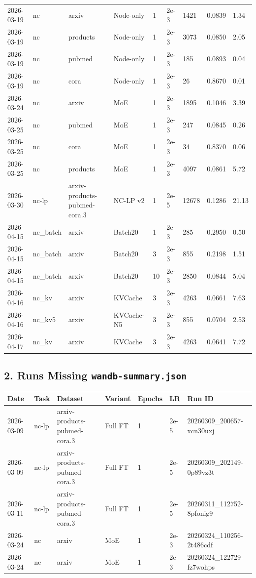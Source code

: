 \begin{longtable}{lllllllll}
2026-03-19 & nc & arxiv & Node-only & 1 & 2e-3 & 1421 & 0.0839 & 1.34 \\
2026-03-19 & nc & products & Node-only & 1 & 2e-3 & 3073 & 0.0850 & 2.05 \\
2026-03-19 & nc & pubmed & Node-only & 1 & 2e-3 & 185 & 0.0893 & 0.04 \\
2026-03-19 & nc & cora & Node-only & 1 & 2e-3 & 26 & 0.8670 & 0.01 \\
2026-03-24 & nc & arxiv & MoE & 1 & 2e-3 & 1895 & 0.1046 & 3.39 \\
2026-03-25 & nc & pubmed & MoE & 1 & 2e-3 & 247 & 0.0845 & 0.26 \\
2026-03-25 & nc & cora & MoE & 1 & 2e-3 & 34 & 0.8370 & 0.06 \\
2026-03-25 & nc & products & MoE & 1 & 2e-3 & 4097 & 0.0861 & 5.72 \\
2026-03-30 & nc-lp & arxiv-products-pubmed-cora.3 & NC-LP v2 & 1 & 2e-5 & 12678 & 0.1286 & 21.13 \\
2026-04-15 & nc\_batch & arxiv & Batch20 & 1 & 2e-3 & 285 & 0.2950 & 0.50 \\
2026-04-15 & nc\_batch & arxiv & Batch20 & 3 & 2e-3 & 855 & 0.2198 & 1.51 \\
2026-04-15 & nc\_batch & arxiv & Batch20 & 10 & 2e-3 & 2850 & 0.0844 & 5.04 \\
2026-04-16 & nc\_kv & arxiv & KVCache & 3 & 2e-3 & 4263 & 0.0661 & 7.63 \\
2026-04-16 & nc\_kv5 & arxiv & KVCache-N5 & 3 & 2e-3 & 855 & 0.0704 & 2.53 \\
2026-04-17 & nc\_kv & arxiv & KVCache & 3 & 2e-3 & 4263 & 0.0641 & 7.72 \\
\bottomrule
\end{longtable}

\subsection*{2. Runs Missing \texttt{wandb-summary.json}}

\begin{tabular}{lllllll}
\toprule
Date & Task & Dataset & Variant & Epochs & LR & Run ID \\
\midrule
2026-03-09 & nc-lp & arxiv-products-pubmed-cora.3 & Full FT & 1 & 2e-5 & 20260309\_200657-xcn30uxj \\
2026-03-09 & nc-lp & arxiv-products-pubmed-cora.3 & Full FT & 1 & 2e-5 & 20260309\_202149-0p89vz3t \\
2026-03-11 & nc-lp & arxiv-products-pubmed-cora.3 & Full FT & 1 & 2e-5 & 20260311\_112752-8pfonig9 \\
2026-03-24 & nc & arxiv & MoE & 1 & 2e-3 & 20260324\_110256-2t486cdf \\
2026-03-24 & nc & arxiv & MoE & 1 & 2e-3 & 20260324\_122729-fz7wohps \\
\bottomrule
\end{tabular}

